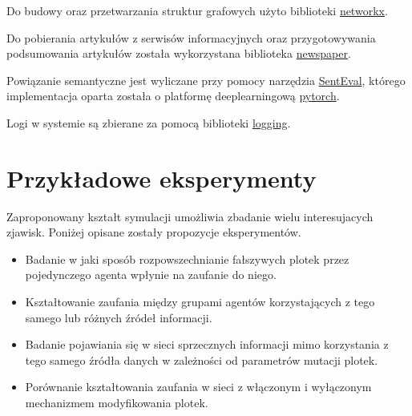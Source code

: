 \documentclass{article}
\begin{document}
	Do budowy oraz przetwarzania struktur grafowych użyto biblioteki \href{https://networkx.github.io/}{networkx}.
	
	Do pobierania artykułów z serwisów informacyjnych oraz przygotowywania podsumowania artykułów została wykorzystana biblioteka  \href{https://newspaper.readthedocs.io/}{newspaper}.
	
	Powiązanie semantyczne jest wyliczane przy pomocy narzędzia \href{http://nlpprogress.com/english/semantic_textual_similarity.html}{SentEval}, którego implementacja oparta została o platformę deeplearningową \href{https://pytorch.org/}{pytorch}.
	
	Logi w systemie są zbierane za pomocą biblioteki \href{https://docs.python.org/3/library/logging.html#module-logging}{logging}.
	
	\section{Przykładowe eksperymenty}
	Zaproponowany kształt symulacji umożliwia zbadanie wielu interesujacych zjawisk. Poniżej opisane zostały propozycje eksperymentów.
	\begin{itemize}
	\item Badanie w jaki sposób rozpowszechnianie fałszywych plotek przez pojedynczego agenta wpłynie na zaufanie do niego.
	\item Kształtowanie zaufania między grupami agentów korzystających z tego samego lub różnych źródeł informacji.
	\item Badanie pojawiania się w sieci sprzecznych informacji mimo korzystania z tego samego źródła danych w zależności od parametrów mutacji plotek.
	\item Porównanie kształtowania zaufania w sieci z włączonym i wyłączonym mechanizmem modyfikowania plotek.
	\end{itemize}
\end{document}
